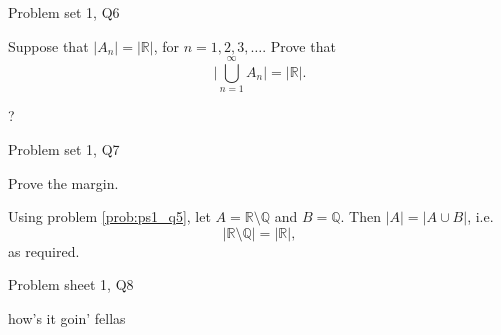 \begin{problem}{Problem set 1, Q6}{}


    Suppose that $\lvert A_n \rvert = \lvert \mathbb{R} \rvert$, for $n = 1, 2, 3, \ldots$. Prove that
        $$ \biggl\vert \bigcup_{n=1}^\infty A_n \biggr\vert
            = \lvert \mathbb{R} \rvert . $$

    \tcblower

    ?

\end{problem}

\begin{problem}{Problem set 1, Q7}{}


    Prove the margin.

    \tcblower

    Using problem \ref{prob:ps1_q5}, let $A = \mathbb{R} \setminus \mathbb{Q}$ and $B = \mathbb{Q}$. Then $\lvert A \rvert = \lvert A \cup B \rvert$, i.e.
        $$ \lvert \mathbb{R} \setminus \mathbb{Q} \rvert = \lvert \mathbb{R} \rvert , $$
    as required.

\end{problem}

\begin{problem}{Problem sheet 1, Q8}{}

    how's it goin' fellas

\end{problem}

